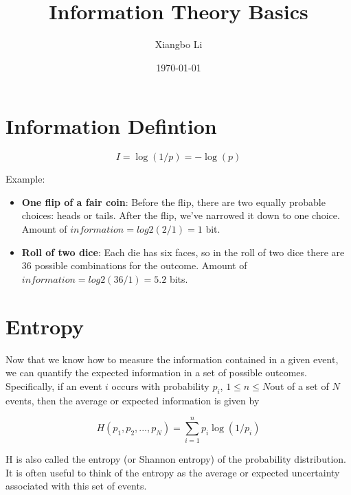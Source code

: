 \documentclass{article}
\title{Information Theory Basics}
\date{\today}
\author{Xiangbo Li}
\begin{document}
\maketitle

\section{Information Defintion}
\begin{equation}
	I = \log(1/p) = -\log(p)
\end{equation}

Example:
\begin{itemize}
	\item{\textbf{One flip of a fair coin}: Before the flip, there are two equally probable choices: heads or tails. After the flip,
	we’ve narrowed it down to one choice. Amount of $information = log2(2/1) = 1$ bit.}
	\item{\textbf{Roll of two dice}: Each die has six faces, so in the roll of two dice there are 36 possible combinations for
	the outcome. Amount of $information = log2(36/1) = 5.2$ bits.}
\end{itemize}

\section{Entropy}
Now that we know how to measure the information contained in a given event, we can quantify the expected information in a set of 
possible outcomes. Specifically, if an event $i$ occurs with probability $p_i$, $1 \leq n \leq N $out of a set of $N$ events, then the average or expected 
information is given by

\begin{equation}
	H(p_1, p_2, ..., p_N) = \sum_{i=1}^np_i\log(1/p_i)
\end{equation}

H is also called the entropy (or Shannon entropy) of the probability distribution.  
It is often useful to think of the entropy as the average or expected uncertainty associated with this set of events.
\end{document}
